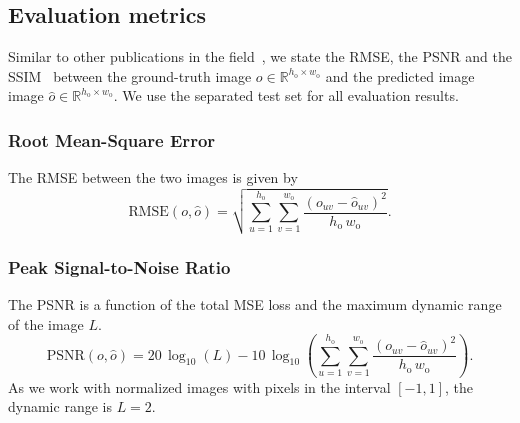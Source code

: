 \subsection{Evaluation metrics}
Similar to other publications in the field~\citep{liu2018image, yu2018generative, stolzle2022reconstructing}, %
we state the \gls{RMSE}, the \gls{PSNR} and the \gls{SSIM}~\citep{wang2004image} between the ground-truth image $o \in \mathbb{R}^{h_\mathrm{o} \times w_\mathrm{o}}$ and the predicted image image $\hat{o} \in \mathbb{R}^{h_\mathrm{o} \times w_\mathrm{o}}$.
We use the separated test set for all evaluation results.

\subsubsection{Root Mean-Square Error}
The \gls{RMSE} between the two images is given by
\begin{equation}
    \text{RMSE}(o, \hat{o}) = \sqrt{\sum_{u = 1}^{h_\mathrm{o}} \sum_{v = 1}^{w_\mathrm{o}} \frac{(o_{uv} - \hat{o}_{uv})^2}{h_\mathrm{o} \, w_\mathrm{o}}}.
\end{equation}

\subsubsection{Peak Signal-to-Noise Ratio}
The \gls{PSNR} is a function of the total \gls{MSE} loss and the maximum dynamic range of the image $L$. 
\begin{equation}
    \mathrm{PSNR}(o, \hat{o}) = 20 \, \log_{10} (L) - 10 \, \log_{10} \left (\sum_{u = 1}^{h_\mathrm{o}} \sum_{v = 1}^{w_\mathrm{o}} \frac{(o_{uv} - \hat{o}_{uv})^2}{h_\mathrm{o} \, w_\mathrm{o}} \right ).
\end{equation}
As we work with normalized images with pixels in the interval $[-1, 1]$, the dynamic range is $L = 2$.


